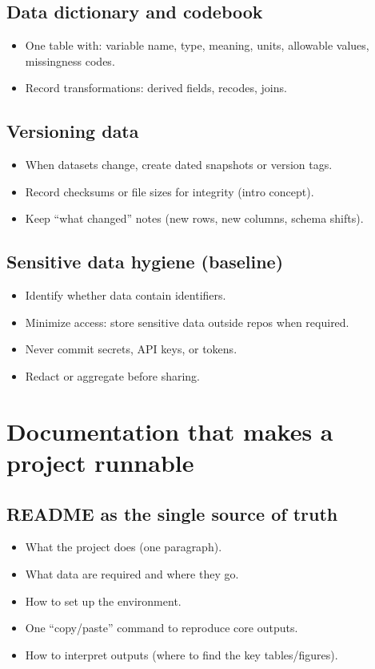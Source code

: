\subsection{Data dictionary and codebook}
\begin{itemize}
\item One table with: variable name, type, meaning, units, allowable values, missingness codes.
\item Record transformations: derived fields, recodes, joins.
\end{itemize}

\subsection{Versioning data}
\begin{itemize}
\item When datasets change, create dated snapshots or version tags.
\item Record checksums or file sizes for integrity (intro concept).
\item Keep ``what changed'' notes (new rows, new columns, schema shifts).
\end{itemize}

\subsection{Sensitive data hygiene (baseline)}
\begin{itemize}
\item Identify whether data contain identifiers.
\item Minimize access: store sensitive data outside repos when required.
\item Never commit secrets, API keys, or tokens.
\item Redact or aggregate before sharing.
\end{itemize}

\section{Documentation that makes a project runnable}
\subsection{README as the single source of truth}
\begin{itemize}
\item What the project does (one paragraph).
\item What data are required and where they go.
\item How to set up the environment.
\item One ``copy/paste'' command to reproduce core outputs.
\item How to interpret outputs (where to find the key tables/figures).
\end{itemize}

